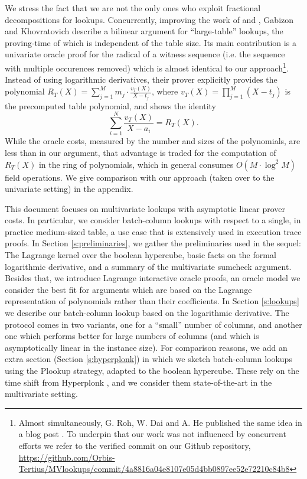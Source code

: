 \documentclass[11pt]{article}
\theoremstyle{definition}
\theoremstyle{remark}
\begin{document}
We stress the fact that we are not the only ones who exploit fractional decompositions for lookups. 
Concurrently, improving the work of \cite{Caulk} and \cite{CaulkPlus}, Gabizon and Khovratovich \cite{flookup} describe a bilinear argument for ``large-table'' lookups, the proving-time of which is independent of the table size. 
Its main contribution is a univariate oracle proof for the radical of a witness sequence (i.e. the sequence with multiple occurences removed) which is almost identical to our approach\footnote{%
Almost simultaneously, G. Roh, W. Dai and A. He published the same idea in a blog post \cite{DaiFlookupBlog}.
To underpin that our work was not influenced by concurrent efforts we refer to the verified commit on our Github repository, 
\url{https://github.com/Orbis-Tertius/MVlookups/commit/4a8816a04e8107e05d4bb0897ee52e72210c84b8} 
}.
Instead of using logarithmic derivatives, their prover explicitly provides the polynomial $R_T(X) = \sum_{j=1}^M m_j \cdot \frac{v_T(X)}{X - t_j}$, where $v_T(X)= \prod_{j=1}^M (X - t_j)$ is the precomputed table polynomial, and shows the identity 
\[
\sum_{i=1}^N \frac{v_T(X)}{X - a_i}  = R_T(X).
\]
While the oracle costs, measured by the number and sizes of the polynomials, are less than in our argument, that advantage is traded for the computation of $R_T(X)$ in the ring of polynomials, which in general consumes $O(M\cdot\log^2 M)$ field operations.
We give comparison with our approach (taken over to the univariate setting) in the appendix. 

This document focuses on multivariate lookups with asymptotic linear prover costs.  
In particular, we consider batch-column lookups with respect to a single, in practice medium-sized table, a use case that is extensively used in execution trace proofs.
In Section \ref{s:preliminaries}, we gather the preliminaries used in the sequel: 
The Lagrange kernel over the boolean hypercube,  basic facts on the formal logarithmic derivative, and a summary of the multivariate sumcheck argument. 
Besides that, we introduce Lagrange interactive oracle proofs, an oracle model we consider the best fit for arguments which are based on the Lagrange representation of polynomials rather than their coefficients.   
In Section \ref{s:lookups} we describe our batch-column lookup based on the logarithmic derivative. 
The protocol comes in two variants, one for a ``small'' number of columns, and another one which performs better for large numbers of columns (and which is asymptotically linear in the instance size). 
For comparison reasons, we add an extra section (Section \ref{s:hyperplonk}) in which we sketch batch-column lookups using the Plookup strategy, adapted to the boolean hypercube. 
These rely on the time shift from Hyperplonk \cite{Hyperplonk}, and we consider them state-of-the-art in the multivariate setting.
\end{document}
